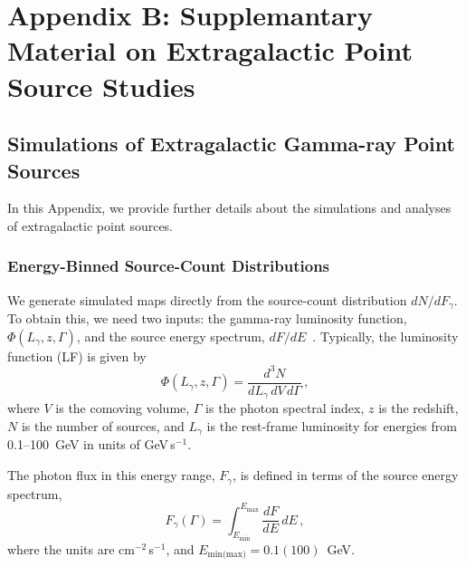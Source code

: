 \chapter{Appendix B: Supplemantary Material on Extragalactic Point Source Studies}

\section{Simulations of Extragalactic Gamma-ray Point Sources}
In this Appendix, we provide further details about the simulations and analyses of extragalactic point sources.

\subsection{Energy-Binned Source-Count Distributions}
\label{app:sims}

We generate simulated maps directly from the source-count distribution $dN/dF_{\gamma}$. To obtain this, we need two inputs: the gamma-ray luminosity function, $\Phi(L_{\gamma},z,\Gamma)$, and the source energy spectrum, $dF/dE$~\cite{DiMauro:2014wha}.  Typically, the luminosity function (LF) is given by
\begin{equation}
\Phi(L_{\gamma},z,\Gamma)=\frac{d^3N}{dL_\gamma\,dV\,d\Gamma} \,  ,
\end{equation}
where $V$ is the comoving volume, $\Gamma$ is the photon spectral index, $z$ is the redshift, $N$ is the number of sources, and $L_\gamma$ is the rest-frame luminosity for energies from 0.1--100~GeV in units of GeV\,s$^{-1}$.     

The photon flux in this energy range, $F_\gamma$, 
is defined in terms of the source energy spectrum,
\begin{equation}
F_\gamma(\Gamma) = \int_{E_\text{min}}^{E_\text{max}}\frac{dF}{dE} \, dE \, ,
\label{eq: Fgamma}
\end{equation}
where the units are cm$^{-2}$\,s$^{-1}$, and $E_\text{min(max)} = 0.1(100)$~GeV.

